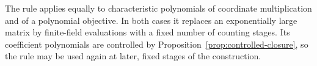 The rule applies equally to characteristic polynomials of coordinate
multiplication and of a polynomial objective.  In both cases it
replaces an exponentially large matrix by finite-field evaluations
with a fixed number of counting stages.  Its coefficient polynomials
are controlled by Proposition~\ref{prop:controlled-closure}, so the
rule may be used again at later, fixed stages of the construction.
